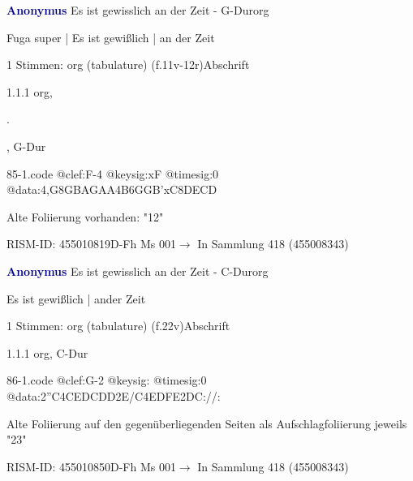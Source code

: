 \documentclass[twocolumn]{book}
\begin{document}
\par \vspace{7pt} \textcolor{darkblue}{\textbf{Anonymus  }}\hfillplus{\textbf{[85]}}\newline Es ist gewisslich an der Zeit - G-Dur\newline org
\par \begin{itshape}[f.11v, at left:] Fuga super | Es ist gewißlich | an der Zeit\end{itshape} 
\par \textcolor{darkblue}{}  1 Stimmen: org (tabulature)  (f.11v-12r)\newline Abschrift
\par 1.1.1  org, \begin{itshape}.\end{itshape}, G-Dur  
\begin{filecontents*}{85-1.code}
@clef:F-4
@keysig:xF
@timesig:0
@data:4,G{8GB}{AGAA}4B{6GGB'xC}{8DECD}
\end{filecontents*}
\newline
%
\par Alte Foliierung vorhanden: "12"
\par RISM-ID: 455010819\newline D-Fh  Ms 001\newline $\rightarrow$ In Sammlung 418 (455008343)
      
\par \vspace{7pt} \textcolor{darkblue}{\textbf{Anonymus  }}\hfillplus{\textbf{[86]}}\newline Es ist gewisslich an der Zeit - C-Dur\newline org
\par \begin{itshape}[f.22v, at left:] Es ist gewißlich | ander Zeit\end{itshape} 
\par \textcolor{darkblue}{}  1 Stimmen: org (tabulature)  (f.22v)\newline Abschrift
\par 1.1.1  org, C-Dur  
\begin{filecontents*}{86-1.code}
@clef:G-2
@keysig:
@timesig:0
@data:2''C4CEDCDD2E/C4EDFE2DC://:
\end{filecontents*}
\newline
%
\par Alte Foliierung auf den gegenüberliegenden Seiten als Aufschlagfoliierung jeweils "23"
\par RISM-ID: 455010850\newline D-Fh  Ms 001\newline $\rightarrow$ In Sammlung 418 (455008343)
      
\end{document}
